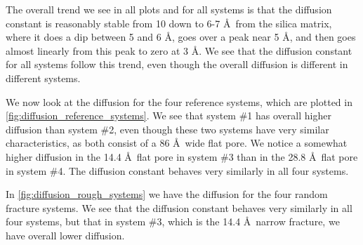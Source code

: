 The overall trend we see in all plots and for all systems is that the diffusion constant is reasonably stable from 10 down to 6-7 \AA\ from the silica matrix, where it does a dip between 5 and 6 \AA, goes over a peak near 5 \AA, and then goes almost linearly from this peak to zero at 3 \AA. We see that the diffusion constant for all systems follow this trend, even though the overall diffusion is different in different systems.

We now look at the diffusion for the four reference systems, which are plotted in \cref{fig:diffusion_reference_systems}. We see that system \#1 has overall higher diffusion than system \#2, even though these two systems have very similar characteristics, as both consist of a 86 \AA\ wide flat pore. We notice a somewhat higher diffusion in the 14.4 \AA\ flat pore in system \#3 than in the 28.8 \AA\ flat pore in system \#4. The diffusion constant behaves very similarly in all four systems.

In \cref{fig:diffusion_rough_systems} we have the diffusion for the four random fracture systems. We see that the diffusion constant behaves very similarly in all four systems, but that in system \#3, which is the 14.4 \AA\ narrow fracture, we have overall lower diffusion.



